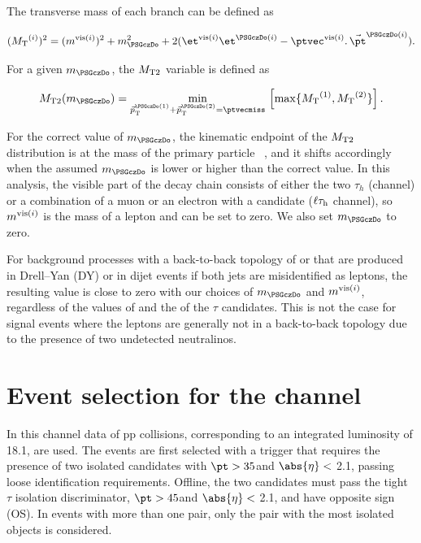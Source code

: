 The transverse mass of each branch can be defined as
\begin{linenomath}
\begin{equation}
\label{eq:mtdef}
(\mt^{(i)})^{2}= (\mvisi)^2+m^2_{\PSGczDo}+2(\etvisi\et^{\PSGczDo(i)}-{\vptvisi}.\,{\vec{\pt}^{\PSGczDo(i)}}).
\end{equation}
\end{linenomath}

For a given $m_{\PSGczDo}$, the ${M_\mathrm{ T2}}$ variable is defined as
\begin{linenomath}
\begin{equation}
\label{eq:mt2def}
\mttwo(m_{\PSGczDo})=\min_{\vec{p}^{\PSGczDo(1)}_\mathrm{T}+\vec{p}_\mathrm{T}^{\PSGczDo(2)}=\ptvecmiss}\,\left[\max\{ \mt^{(1)},\mt^{(2)}\}\right].
\end{equation}
\end{linenomath}

For the correct value of $m_{\PSGczDo}$, the kinematic endpoint of the ${M_\mathrm{ T2}}$ distribution is at the mass of the primary particle ~\cite{Affolder:2000bpa,Abazov:2002bu}, and it shifts accordingly when the assumed $m_{\PSGczDo}$ is lower or higher than the correct value. In this analysis,
the visible part of the decay chain consists of either the two $\tau_h$ (\tauTau channel)
or a combination of a muon or an electron with a \Tau candidate ($\ell\tau_\mathrm{h}$ channel), so $m^{\text{vis}(i)}$ is the mass of a lepton and can be set to zero. We also set $m_{\PSGczDo}$ to zero.


For background processes with a back-to-back topology of \tauTau  or \leptonTau  that are produced in Drell--Yan (DY) or in dijet events if both jets
are misidentified as leptons, the resulting \mttwo value is close to zero with our choices of $m_{\PSGczDo}$ and $m^{\text{vis}(i)}$, regardless of the values of
\MPT and the \pt of  the $\tau$ candidates. This is not the case for signal events where the leptons are generally not in a back-to-back topology due
to the presence of two undetected neutralinos.
\section{\texorpdfstring{Event selection for the \tauTau channel}{Event selection for the tau-tau channel}}
\label{sect:tauTauCuts}
In this channel data of pp collisions,  corresponding to an integrated luminosity of 18.1\fbinv, are used.
The events are first selected with a trigger \cite{Chatrchyan:2011nv} that requires the presence of two isolated
\Tau candidates with $\pt > 35$\GeV and $\abs{\eta}<$ 2.1, passing loose identification requirements.
Offline, the two \Tau candidates must pass the tight $\tau$ isolation discriminator,
$\pt > 45$\GeV and $\abs{\eta}<$ 2.1, and have opposite sign (OS).
In events with more than one \tauTau pair, only the pair with the most isolated \Tau objects is considered.

